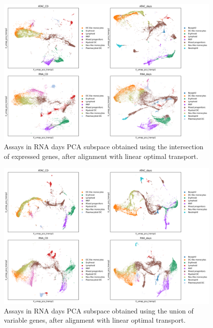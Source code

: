 \documentclass[a4paper]{article}
\begin{document}
\begin{figure}[!htb]
  \centering
  \includegraphics[width=\textwidth]{../figures/hematopoiesis/assays_RNA_days_subspace_aligned_Intersection_of_expressed_genes_leiden_identity_simple2.png}
  \caption{Assays in RNA days PCA subspace obtained using the intersection of expressed genes, after alignment with linear optimal transport.}
\end{figure}

\begin{figure}[!htb]
  \centering
  \includegraphics[width=\textwidth]{../figures/hematopoiesis/assays_RNA_days_subspace_aligned_Union_of_variable_genes_leiden_identity_simple2.png}
  \caption{Assays in RNA days PCA subspace obtained using the union of variable genes, after alignment with linear optimal transport.}
\end{figure}
\end{document}
